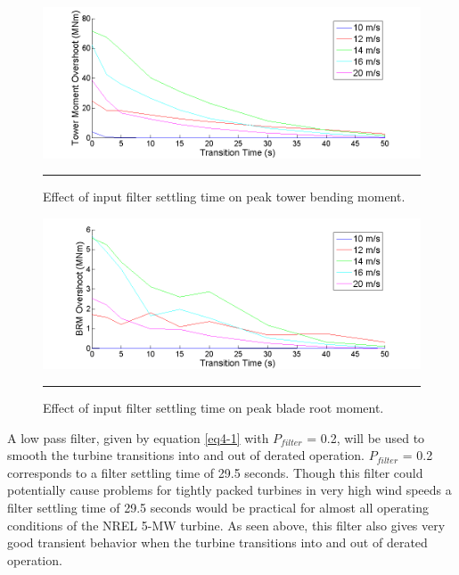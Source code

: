 \begin{figure}[htbp]
	\centering
		\includegraphics[trim = {1cm 0 2cm 0}, clip, width = \linewidth]{Figures/ch4Figures/fig4-18.png}
		\rule{35em}{0.5pt}
	\caption{Effect of input filter settling time on peak tower bending moment.}
	\label{fig4-18}
\end{figure}

\begin{figure}[htbp]
	\centering
		\includegraphics[trim = {1cm 0 2cm 0}, clip, width = \linewidth]{Figures/ch4Figures/fig4-19.png}
		\rule{35em}{0.5pt}
	\caption{Effect of input filter settling time on peak blade root moment.}
	\label{fig4-19}
\end{figure}

A low pass filter, given by equation \ref{eq4-1} with $P_{filter}$ = 0.2, will be used to smooth the turbine transitions into and out of derated operation.  $P_{filter}$ = 0.2 corresponds to a filter settling time of 29.5 seconds. Though this filter could potentially cause problems for tightly packed turbines in very high wind speeds a filter settling time of 29.5 seconds would be practical for almost all operating conditions of the NREL 5-MW turbine. As seen above, this filter also gives very good transient behavior when the turbine transitions into and out of derated operation. 


